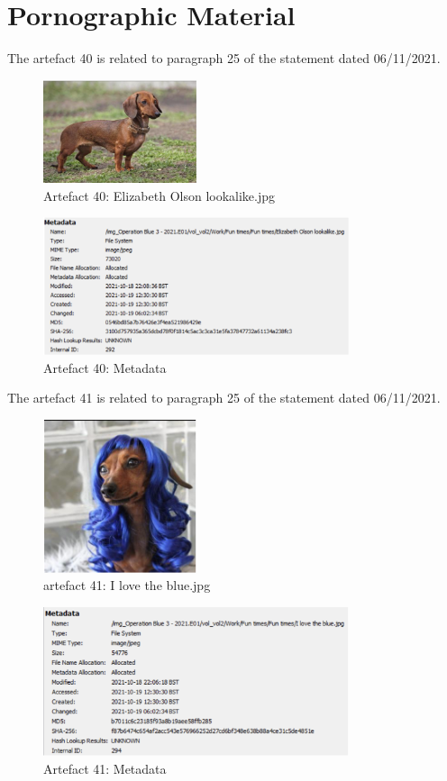 \section{Pornographic Material}
\label{s:pornographic2}
The artefact 40 is related to paragraph 25 of the statement dated 06/11/2021.
\begin{figure}[H]
  \centering
  \includegraphics[width=0.4\textwidth]{figures/artefact40}
  \caption{Artefact 40: Elizabeth Olson lookalike.jpg}
  \label{f:artefact40}
\end{figure}
\begin{figure}[H]
  \centering
  \includegraphics[width=0.8\textwidth]{figures/meta40}
  \caption{Artefact 40: Metadata}
  \label{f:meta40}
\end{figure}
The artefact 41 is related to paragraph 25 of the statement dated 06/11/2021.
\begin{figure}[H]
  \centering
  \includegraphics[width=0.4\textwidth]{figures/artefact41}
  \caption{artefact 41: I love the blue.jpg}
  \label{f:artefact41}
\end{figure}
\begin{figure}[H]
  \centering
  \includegraphics[width=0.8\textwidth]{figures/meta41}
  \caption{Artefact 41: Metadata}
  \label{f:meta41}
\end{figure}
